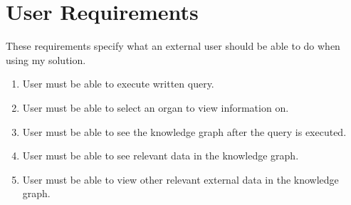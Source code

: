 \section{User Requirements}
\hspace{0.5cm} These requirements specify what an external user should be able to do when using my solution.
\begin{enumerate}
\item User must be able to execute written query.
\item User must be able to select an organ to view information on. 
\item User must be able to see the knowledge graph after the query is executed.
\item User must be able to see relevant data in the knowledge graph.
\item User must be able to view other relevant external data in the knowledge graph.
\end{enumerate}

